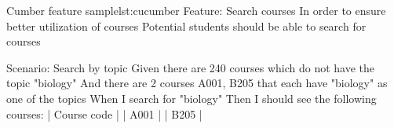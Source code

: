 \begin{rubycode}{Cumber feature sample}{lst:cucumber}
Feature: Search courses
  In order to ensure better utilization of courses
  Potential students should be able to search for courses

  Scenario: Search by topic
    Given there are 240 courses which do not have the topic "biology"
    And there are 2 courses A001, B205 that each have "biology" as one of the topics
    When I search for "biology"
    Then I should see the following courses:
      | Course code |
      | A001        |
      | B205        |
\end{rubycode}





% 
% 
% 
% 
%  
% 
% 
% 

